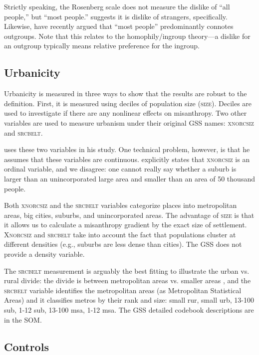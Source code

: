 \documentclass[11pt, letterpaper]{article}
\begin{document}
\begin{spacing}{1.4}
Strictly speaking, the Rosenberg scale does not measure the dislike of ``all people,'' but ``most people.'' \citet{wilson85} suggests it is dislike of strangers, specifically. Likewise, \citet{delhey11} have recently argued that ``most people'' predominantly connotes outgroups. Note that this relates to the homophily/ingroup theory---a dislike for an outgroup typically means relative preference for the ingroup. 
 
\subsection*{Urbanicity}

Urbanicity is measured in three ways to show that the
results are robust to the definition. First, it is measured using deciles of population size
(\textsc{size}). Deciles are used to investigate if there are any nonlinear
effects on misanthropy. Two other variables are used to measure urbanism under
their original GSS names: \textsc{xnorcsiz} and \textsc{srcbelt}.

{\citet{wilson85} uses these two variables in his study. One technical problem,
  however, is that he assumes that these variables are
  continuous. \citet{wilson85} explicitly states that \textsc{xnorcsiz} is an ordinal
  variable, and we disagree: one cannot really say whether a suburb is larger
  than an unincorporated large area and smaller than an area of 50 thousand
  people.}

Both \textsc{xnorcsiz} and the \textsc{srcbelt} variables categorize places into metropolitan areas, big cities, suburbs, and  unincorporated areas. The advantage of \textsc{size} is that it allows us to calculate a misanthropy 
 gradient by the exact size of settlement. \textsc{Xnorcsiz} and \textsc{srcbelt} take into account the fact that populations cluster at different densities (e.g., suburbs are less dense than cities). The GSS does not provide a density variable. 

The \textsc{srcbelt} measurement is arguably the best fitting to illustrate the
urban vs. rural divide: the divide is between metropolitan areas vs. smaller areas
\citep{hansonCityJournalautumn15}, and the \textsc{srcbelt} variable identifies the
metropolitan areas (as Metropolitan Statistical Areas) and it classifies metros
by their rank and size: small rur, small urb, 13-100 sub, 1-12 sub, 13-100 msa, 1-12 msa. The GSS detailed codebook descriptions are in the SOM. 
   

\subsection*{Controls}


\end{spacing}
\end{document}
